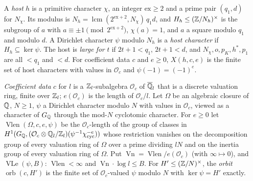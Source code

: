 \begin{definition}[hosts]\label{sha:host}
A \emph{host} $h$ is a primitive character $\chi$, an integer $\mathrm{ex}\ge2$ and a prime
pair $(q_1,d)$ for $N_{\chi}$. Its modulus is
$N_h=\operatorname{lcm}(2^{\mathrm{ex}+2},N_{\chi})\,q_1d$, and $H_h\le(\mathbb{Z}/N_h)^{\times}$ is the
subgroup of $a$ with $a\equiv\pm1\pmod{2^{\mathrm{ex}+2}}$, $\chi(a)=1$, and $a$ a square
modulo $q_1$ and modulo $d$. A Dirichlet character $\psi$ modulo $N_h$ is a
\emph{host character} if $H_h\subseteq\ker\psi$. The host is \emph{large for $t$} if
$2t+1<q_1$, $2t+1<d$, and $N_{\chi},o,p_K,h^*,p_1$ are all $<q_1$ and $<d$. For coefficient
data $c$ and $e\ge0$, $X(h,c,e)$ is the finite set of host characters with values in
$\mathcal O_c$ and $\psi(-1)=(-1)^e$.
\end{definition}

\begin{definition}\label{sha:vlen}
\emph{Coefficient data} $c$ for $l$ is a $\mathbb{Z}_l$-subalgebra $\mathcal O_c$ of
$\overline{\mathbb{Q}}_l$ that is a discrete valuation ring, finite over $\mathbb{Z}_l$; $e(\mathcal O_c)$
is the length of $\mathcal O_c/l$. Let $\Omega$ be an algebraic closure of $\mathbb{Q}$, $N\ge1$, $\psi$
a Dirichlet character modulo $N$ with values in $\mathcal O_c$, viewed as a character of
$G_{\mathbb{Q}}$ through the mod-$N$ cyclotomic character. For $e\ge0$ let
$\operatorname{Vlen}(\Omega,c,e,\psi)$ be the $\mathcal O_c$-length of the group of classes in
$H^1(G_{\mathbb{Q}},(\mathcal O_c\otimes\mathbb{Q}_l/\mathbb{Z}_l)(\psi^{-1}\chi_{\mathrm{cyc}}^{-e}))$ whose restriction
vanishes on the decomposition group of every valuation ring of $\Omega$ over a prime
dividing $lN$ and on the inertia group of every valuation ring of $\Omega$. Put
$\operatorname{Vn}=\operatorname{Vlen}/e(\mathcal O_c)$ (with $\infty\mapsto0$), and
$\operatorname{VLe}(\psi,B)$: $\operatorname{Vlen}<\infty$ and
$\operatorname{Vn}\cdot\log l\le B$. For $H'\le(\mathbb{Z}/N)^{\times}$, the \emph{orbit}
$\operatorname{orb}(c,H')$ is the finite set of $\mathcal O_c$-valued $\psi$ modulo $N$ with
$\ker\psi=H'$ exactly.
\end{definition}

